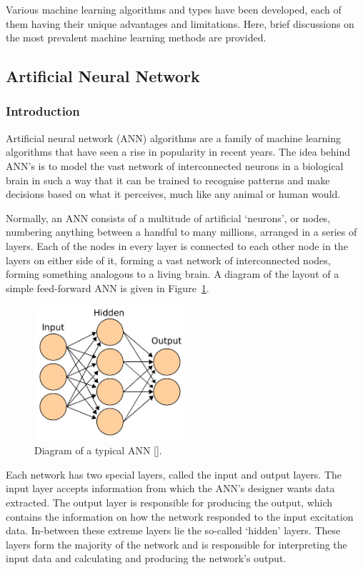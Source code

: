 Various machine learning algorithms and types have been developed, each of them having their unique advantages and limitations. Here, brief discussions on the most prevalent machine learning methods are provided. 

\subsection{Artificial Neural Network}

\subsubsection{Introduction}

Artificial neural network (ANN) algorithms are a family of machine learning algorithms that have seen a rise in popularity in recent years. The idea behind ANN's is to model the vast network of interconnected neurons in a biological brain in such a way that it can be trained to recognise patterns and make decisions based on what it perceives, much like any animal or human would. 

Normally, an ANN consists of a multitude of artificial `neurons', or nodes, numbering anything between a handful to many millions, arranged in a series of layers. Each of the nodes in every layer is connected to each other node in the layers on either side of it, forming a vast network of interconnected nodes, forming something analogous to a living brain. A diagram of the layout of a simple feed-forward ANN is given in Figure~\ref{fig:chap2-ann-layout}.

\begin{figure}
  \centering
  \includegraphics[width=0.5\textwidth]{figures/chapter2/ANN_diagram}
  \caption[Diagram of a typical ANN.]{Diagram of a typical ANN [\cite{ann-wiki-pic}].}
\label{fig:chap2-ann-layout}
\end{figure}

Each network has two special layers, called the input and output layers. The input layer accepts information from which the ANN's designer wants data extracted. The output layer is responsible for producing the output, which contains the information on how the network responded to the input excitation data. In-between these extreme layers lie the so-called `hidden' layers. These layers form the majority of the network and is responsible for interpreting the input data and calculating and producing the network's output. 

